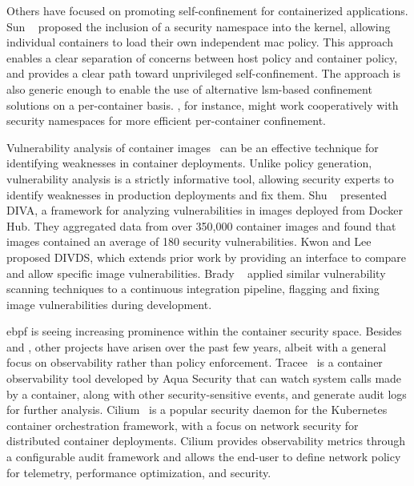 Others have focused on promoting self-confinement for containerized applications. Sun
\etal~\cite{sun2018_security_namespace} proposed the inclusion of a security namespace
into the kernel, allowing individual containers to load their own independent \gls{mac}
policy. This approach enables a clear separation of concerns between host policy and
container policy, and provides a clear path toward unprivileged self-confinement. The
approach is also generic enough to enable the use of alternative \gls{lsm}-based
confinement solutions on a per-container basis. \bpfcontain{}, for instance, might work
cooperatively with security namespaces for more efficient per-container confinement.

Vulnerability analysis of container images~\cite{shu2017_image_vuln, kwon2020_divds,
brady2020_docker_cloud} can be an effective technique for identifying weaknesses in
container deployments. Unlike policy generation, vulnerability analysis is a strictly
informative tool, allowing security experts to identify weaknesses in production
deployments and fix them. Shu \etal~\cite{shu2017_image_vuln} presented DIVA, a framework
for analyzing vulnerabilities in images deployed from Docker Hub. They aggregated data
from over 350,000 container images and found that images contained an average of 180
security vulnerabilities. Kwon and Lee~\cite{kwon2020_divds} proposed DIVDS, which
extends prior work by providing an interface to compare and allow specific image
vulnerabilities.  Brady \etal~\cite{brady2020_docker_cloud} applied similar vulnerability
scanning techniques to a continuous integration pipeline, flagging and fixing image
vulnerabilities during development.

\gls{ebpf} is seeing increasing prominence within the container security space. Besides
\bpfbox{} and \bpfcontain{}, other projects have arisen over the past few years, albeit
with a general focus on observability rather than policy enforcement. Tracee~\cite{tracee}
is a container observability tool developed by Aqua Security that can watch system calls
made by a container, along with other security-sensitive events, and generate audit logs
for further analysis. Cilium~\cite{cilium} is a popular security daemon for the Kubernetes
container orchestration framework, with a focus on network security for distributed
container deployments. Cilium provides observability metrics through a configurable audit
framework and allows the end-user to define network policy for telemetry, performance
optimization, and security.

